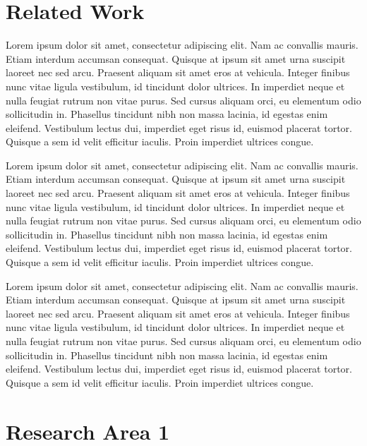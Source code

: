\documentclass[oneside]{memoir}
\begin{document}
%
%

\chapter{Related Work}
\label{ch:related}
Lorem ipsum dolor sit amet, consectetur adipiscing elit. Nam ac convallis mauris. Etiam interdum accumsan consequat. Quisque at ipsum sit amet urna suscipit laoreet nec sed arcu. Praesent aliquam sit amet eros at vehicula. Integer finibus nunc vitae ligula vestibulum, id tincidunt dolor ultrices. In imperdiet neque et nulla feugiat rutrum non vitae purus. Sed cursus aliquam orci, eu elementum odio sollicitudin in. Phasellus tincidunt nibh non massa lacinia, id egestas enim eleifend. Vestibulum lectus dui, imperdiet eget risus id, euismod placerat tortor. Quisque a sem id velit efficitur iaculis. Proin imperdiet ultrices congue.

Lorem ipsum dolor sit amet, consectetur adipiscing elit. Nam ac convallis mauris. Etiam interdum accumsan consequat. Quisque at ipsum sit amet urna suscipit laoreet nec sed arcu. Praesent aliquam sit amet eros at vehicula. Integer finibus nunc vitae ligula vestibulum, id tincidunt dolor ultrices. In imperdiet neque et nulla feugiat rutrum non vitae purus. Sed cursus aliquam orci, eu elementum odio sollicitudin in. Phasellus tincidunt nibh non massa lacinia, id egestas enim eleifend. Vestibulum lectus dui, imperdiet eget risus id, euismod placerat tortor. Quisque a sem id velit efficitur iaculis. Proin imperdiet ultrices congue.

Lorem ipsum dolor sit amet, consectetur adipiscing elit. Nam ac convallis mauris. Etiam interdum accumsan consequat. Quisque at ipsum sit amet urna suscipit laoreet nec sed arcu. Praesent aliquam sit amet eros at vehicula. Integer finibus nunc vitae ligula vestibulum, id tincidunt dolor ultrices. In imperdiet neque et nulla feugiat rutrum non vitae purus. Sed cursus aliquam orci, eu elementum odio sollicitudin in. Phasellus tincidunt nibh non massa lacinia, id egestas enim eleifend. Vestibulum lectus dui, imperdiet eget risus id, euismod placerat tortor. Quisque a sem id velit efficitur iaculis. Proin imperdiet ultrices congue.

%
%

\chapter{Research Area 1}
\label{ch:eventDisc}
\end{document}
